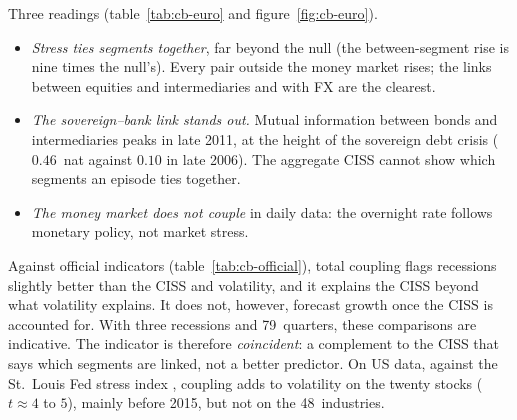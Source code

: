 \documentclass[11pt]{article}
\theoremstyle{definition}
\begin{document}
Three readings (table~\ref{tab:cb-euro} and figure~\ref{fig:cb-euro}).
\begin{itemize}
\item \emph{Stress ties segments together}, far beyond the null (the
between-segment rise is nine times the null's). Every pair outside the money
market rises; the links between equities and intermediaries and with FX are
the clearest.
\item \emph{The sovereign--bank link stands out.} Mutual information between
bonds and intermediaries peaks in late 2011, at the height of the sovereign
debt crisis ($0.46$~nat against $0.10$ in late 2006). The aggregate CISS
cannot show which segments an episode ties together.
\item \emph{The money market does not couple} in daily data: the overnight
rate follows monetary policy, not market stress.
\end{itemize}

\begin{table}[htbp]
\centering
\small
{}
\caption{Euro area against official indicators. The AUROC is the probability
that a randomly drawn recession date has a higher indicator than a
non-recession date ($0.5$: no power; $1$: perfect separation).
Growth-at-Risk: regression of the bottom decile of four-quarter GDP growth on
the indicator \citep{adrian2019}, 79~quarters.}
\label{tab:cb-official}
\end{table}

Against official indicators (table~\ref{tab:cb-official}), total coupling
flags recessions slightly better than the CISS and volatility, and it explains
the CISS beyond what volatility explains. It does not, however, forecast
growth once the CISS is accounted for. With three recessions and
79~quarters, these comparisons are indicative. The indicator is therefore
\emph{coincident}: a complement to the CISS that says which segments are
linked, not a better predictor. On US data, against the St.~Louis Fed stress
index \citep{kliesen2010}, coupling adds to volatility on the twenty stocks
($t\approx4$ to $5$), mainly before 2015, but not on the 48~industries.
\end{document}
